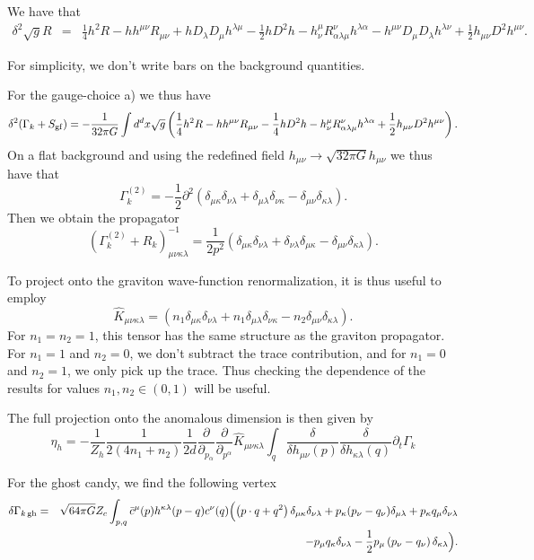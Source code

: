 \documentclass[11pt]{book} %
\newcommand{\be}{\begin{equation}}
\newcommand{\ee}{\end{equation}}
\newcommand{\bea}{\begin{eqnarray}}
\newcommand{\eea}{\end{eqnarray}}
\numberwithin{equation}{chapter}
\begin{document}
{\begin{appendices}
We have that
\bea
\delta^2 \sqrt{g}R &=& \frac{1}{4}h^2 R - h h^{\mu \nu}R_{\mu \nu} + hD_{\lambda}D_{\mu}h^{\lambda \mu} - \frac{1}{2}h D^2 h - h^{\mu}_{\nu}R^{\nu}_{\alpha \lambda \mu}h^{\lambda \alpha} - h^{\mu \nu}D_{\mu}D_{\lambda}h^{\lambda\nu}+ \frac{1}{2}h_{\mu \nu}D^2 h^{\mu \nu}.
\eea

For simplicity, we don't write bars on the background quantities.

For the gauge-choice a) we thus have
\be
\delta^2(\Gamma_k+S_{\rm gf})= -\frac{1}{32 \pi G} \int d^dx \sqrt{g}\left(\frac{1}{4}h^2 R - h h^{\mu \nu}R_{\mu \nu} - \frac{1}{4}h D^2 h  - h^{\mu}_{\nu}R^{\nu}_{\alpha \lambda \mu}h^{\lambda \alpha}+ \frac{1}{2}h_{\mu \nu}D^2 h^{\mu \nu}\right).
\ee
On a flat background and using the redefined field $h_{\mu \nu} \rightarrow \sqrt{32 \pi G} h_{\mu \nu}$ we thus have that
\be
\Gamma_k^{(2)} = - \frac{1}{2}\partial^2 \left(\delta_{\mu \kappa}\delta_{\nu \lambda} + \delta_{\mu \lambda} \delta_{\nu \kappa} - \delta_{\mu \nu} \delta_{\kappa \lambda} \right).
\ee
Then we obtain the propagator
\be
(\Gamma_k^{(2)}+R_k)^{-1}_{\mu \nu \kappa \lambda} = \frac{1}{2 p^2}(\delta_{\mu \kappa} \delta_{\nu \lambda}+ \delta_{\nu\lambda}\delta_{\mu\kappa} - \delta_{\mu \nu}\delta_{\kappa \lambda}).
\ee

To project onto the graviton wave-function renormalization, it is thus useful to employ
\be
\hat{K}_{\mu \nu\kappa \lambda}= \left(n_1 \delta_{\mu \kappa}\delta_{\nu \lambda} + n_1 \delta_{\mu \lambda} \delta_{\nu \kappa} -n_2 \delta_{\mu \nu} \delta_{\kappa \lambda} \right).\label{extproj}
\ee
For $n_1=n_2=1$, this tensor has the same structure as the graviton propagator. For $n_1=1$ and $n_2=0$, we don't subtract the trace contribution, and for $n_1=0$ and $n_2=1$, we only pick up the trace. Thus checking the dependence of the results for values $n_1, n_2 \in (0,1)$ will be useful.

The full projection onto the anomalous dimension is then given by
\be
\eta_h = - \frac{1}{Z_h} \frac{1}{2(4n_1+n_2)} \frac{1}{2 d} \frac{\partial}{\partial_{p_{\alpha}}} \frac{\partial}{\partial_{p^{\alpha}}} \hat{K}_{\mu \nu\kappa\lambda} \int_q \frac{\delta}{\delta h_{\mu \nu}(p)}\frac{\delta}{\delta h_{\kappa \lambda}(q)} \partial_t \Gamma_k
\ee

For the ghost candy, we find the following vertex
\bea
\delta \Gamma_{k\, \rm gh}&=& \sqrt{64 \pi G} Z_c \int_{p,q} \bar{c}^{\mu} (p)h^{\kappa \lambda}(p-q)c^{\nu}(q) \Bigl(\left(p\cdot q+q^2\right) \delta_{\mu \kappa} \delta_{\nu\lambda} +p_{\kappa}(p_{\nu}-q_{\nu})\delta_{\mu \lambda} + p_{\kappa}q_{\mu}\delta_{\nu \lambda}\nonumber\\
&{}& - p_{\mu}q_{\kappa}\delta_{\nu \lambda} - \frac{1}{2} p_{\mu}\left(p_{\nu}-q_{\nu}\right)\delta_{\kappa \lambda}\Bigr).
\eea



\end{appendices}}
\end{document}
